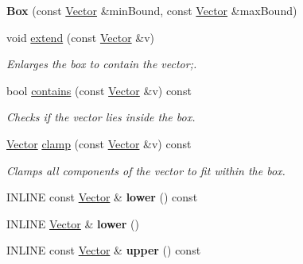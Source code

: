 \begin{DoxyCompactItemize}
\item 
\hypertarget{classBox_a8c328c18411cc1ade2b95f41e157e9a7}{}\label{classBox_a8c328c18411cc1ade2b95f41e157e9a7} 
{\bfseries Box} (const \hyperlink{classBasicVector}{Vector} \&min\+Bound, const \hyperlink{classBasicVector}{Vector} \&max\+Bound)
\item 
\hypertarget{classBox_aad914d290bee7d61a8bb9e3ac6a3a0c4}{}\label{classBox_aad914d290bee7d61a8bb9e3ac6a3a0c4} 
void \hyperlink{classBox_aad914d290bee7d61a8bb9e3ac6a3a0c4}{extend} (const \hyperlink{classBasicVector}{Vector} \&v)
\begin{DoxyCompactList}\small\item\em Enlarges the box to contain the vector;. \end{DoxyCompactList}\item 
\hypertarget{classBox_ab63d1b877eac090299b2e7f1966e4e6e}{}\label{classBox_ab63d1b877eac090299b2e7f1966e4e6e} 
bool \hyperlink{classBox_ab63d1b877eac090299b2e7f1966e4e6e}{contains} (const \hyperlink{classBasicVector}{Vector} \&v) const
\begin{DoxyCompactList}\small\item\em Checks if the vector lies inside the box. \end{DoxyCompactList}\item 
\hypertarget{classBox_adf1d609338da84d31c8b0e010fe5f907}{}\label{classBox_adf1d609338da84d31c8b0e010fe5f907} 
\hyperlink{classBasicVector}{Vector} \hyperlink{classBox_adf1d609338da84d31c8b0e010fe5f907}{clamp} (const \hyperlink{classBasicVector}{Vector} \&v) const
\begin{DoxyCompactList}\small\item\em Clamps all components of the vector to fit within the box. \end{DoxyCompactList}\item 
\hypertarget{classBox_a31dcc6067218190c5cb781b8798ff23d}{}\label{classBox_a31dcc6067218190c5cb781b8798ff23d} 
I\+N\+L\+I\+NE const \hyperlink{classBasicVector}{Vector} \& {\bfseries lower} () const
\item 
\hypertarget{classBox_a605768bd1e2d0cd6bf00c55414501d78}{}\label{classBox_a605768bd1e2d0cd6bf00c55414501d78} 
I\+N\+L\+I\+NE \hyperlink{classBasicVector}{Vector} \& {\bfseries lower} ()
\item 
\hypertarget{classBox_a5065b3a87925aa52ff527da479284f9a}{}\label{classBox_a5065b3a87925aa52ff527da479284f9a} 
I\+N\+L\+I\+NE const \hyperlink{classBasicVector}{Vector} \& {\bfseries upper} () const

\end{DoxyCompactItemize}
